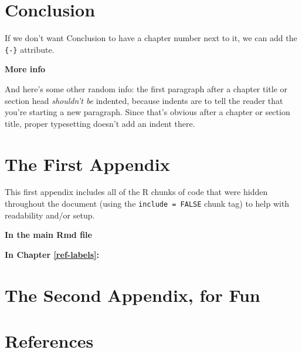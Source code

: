 \documentclass[12pt,twoside]{fmupthesis}
\begin{document}
\hypertarget{conclusion}{%
\chapter*{Conclusion}\label{conclusion}}

If we don't want Conclusion to have a chapter number next to it, we can add the \texttt{\{-\}} attribute.

\textbf{More info}

And here's some other random info: the first paragraph after a chapter title or section head \emph{shouldn't be} indented, because indents are to tell the reader that you're starting a new paragraph. Since that's obvious after a chapter or section title, proper typesetting doesn't add an indent there.

\appendix

\hypertarget{the-first-appendix}{%
\chapter{The First Appendix}\label{the-first-appendix}}

This first appendix includes all of the R chunks of code that were hidden throughout the document (using the \texttt{include\ =\ FALSE} chunk tag) to help with readability and/or setup.

\textbf{In the main Rmd file}

\textbf{In Chapter \ref{ref-labels}:}

\hypertarget{the-second-appendix-for-fun}{%
\chapter{The Second Appendix, for Fun}\label{the-second-appendix-for-fun}}

\backmatter

\hypertarget{references}{%
\chapter*{References}\label{references}}


\noindent

\setlength{\parindent}{-0.20in}
\setlength{\leftskip}{0.20in}
\setlength{\parskip}{8pt}
\end{document}
